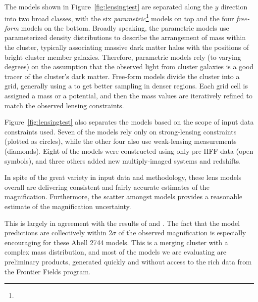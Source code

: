 The models shown in Figure~\ref{fig:lensingtest} are separated along
the $y$ direction into two broad classes, with the
six  {\it parametric}\footnote{}
models on top and the four {\it free-form} models on the bottom.
Broadly speaking, the parametric models use parameterized density
distributions to describe the arrangement of mass within the cluster,
typically associating massive dark matter halos with the positions of
bright cluster member galaxies. Therefore, parametric models rely (to
varying degrees) on the assumption that the observed light from
cluster galaxies is a good tracer of the cluster's dark matter.
Free-form models divide the cluster into a grid, generally using a
 to get better sampling in denser regions. Each grid cell
is assigned a mass or a potential, and then the mass values are
iteratively refined to match the observed lensing
constraints. 

Figure~\ref{fig:lensingtest} also separates the models based on the
scope of input data constraints used.  Seven of the models rely only
on strong-lensing constraints (plotted as circles), while the other
four also use weak-lensing measurements (diamonds).  Eight of the
models were constructed using only pre-HFF data (open symbols), and
three others added new multiply-imaged systems and redshifts.

In spite of the great variety in input data and methodology, these
lens models overall are delivering consistent and fairly accurate
estimates of the magnification.    Furthermore, the scatter amongst
models provides a reasonable estimate of the magnification
uncertainty. 

This is largely in agreement with the results
of  and \citet{Nordin:2014}.  The fact that the
model predictions are collectively within $2\sigma$ of the observed
magnification is especially encouraging for these Abell 2744
models. This is a merging cluster with a complex mass distribution,
and most of the models we are evaluating are preliminary products,
generated quickly and without access to the rich data from the
Frontier Fields program.

